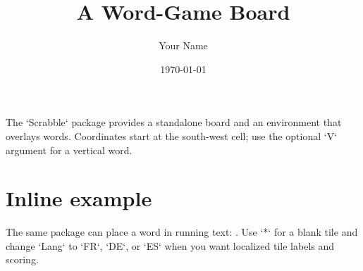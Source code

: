 \documentclass[10pt,a4paper]{article}
\title{A Word-Game Board}
\author{Your Name}
\date{\today}
\begin{document}
\maketitle

\noindent The `Scrabble` package provides a standalone board and an
environment that overlays words. Coordinates start at the south-west cell;
use the optional `V` argument for a vertical word.

\begin{center}
  \begin{EnvScrabble}[Scale=0.43,Labels=false,Help]
  \end{EnvScrabble}
\end{center}

\section*{Inline example}
The same package can place a word in running text:
.
Use `*` for a blank tile and change `Lang` to `FR`, `DE`, or `ES` when you
want localized tile labels and scoring.
\end{document}
